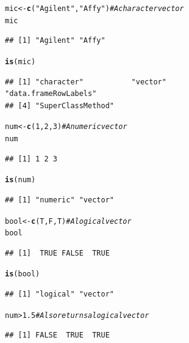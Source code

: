 \documentclass[10pt]{article}\usepackage[]{graphicx}\usepackage[]{color}
\makeatletter
\newcommand{\hlnum}[1]{\textcolor[rgb]{0.686,0.059,0.569}{#1}}%
\newcommand{\hlstr}[1]{\textcolor[rgb]{0.192,0.494,0.8}{#1}}%
\newcommand{\hlcom}[1]{\textcolor[rgb]{0.678,0.584,0.686}{\textit{#1}}}%
\newcommand{\hlopt}[1]{\textcolor[rgb]{0,0,0}{#1}}%
\newcommand{\hlstd}[1]{\textcolor[rgb]{0.345,0.345,0.345}{#1}}%
\newcommand{\hlkwb}[1]{\textcolor[rgb]{0.69,0.353,0.396}{#1}}%
\newcommand{\hlkwd}[1]{\textcolor[rgb]{0.737,0.353,0.396}{\textbf{#1}}}%
\newenvironment{kframe}{%
 \def\at@end@of@kframe{}%
 \ifinner\ifhmode%
  \def\at@end@of@kframe{\end{minipage}}%
  \begin{minipage}{\columnwidth}%
 \fi\fi%
 \def\FrameCommand##1{\hskip\@totalleftmargin \hskip-\fboxsep
 \colorbox{shadecolor}{##1}\hskip-\fboxsep
     \hskip-\linewidth \hskip-\@totalleftmargin \hskip\columnwidth}%
 \MakeFramed {\advance\hsize-\width
   \@totalleftmargin\z@ \linewidth\hsize
   \@setminipage}}%
 {\par\unskip\endMakeFramed%
 \at@end@of@kframe}
\newenvironment{knitrout}{}{} %
\makeatother
\begin{document}
\begin{knitrout}
\color{fgcolor}\begin{kframe}
\begin{alltt}
\hlstd{mic} \hlkwb{<-} \hlkwd{c}\hlstd{(}\hlstr{"Agilent"}\hlstd{,} \hlstr{"Affy"}\hlstd{)}       \hlcom{# A character vector}
\hlstd{mic}
\end{alltt}
\begin{verbatim}
## [1] "Agilent" "Affy"
\end{verbatim}
\begin{alltt}
\hlkwd{is}\hlstd{(mic)}
\end{alltt}
\begin{verbatim}
## [1] "character"           "vector"              "data.frameRowLabels"
## [4] "SuperClassMethod"
\end{verbatim}
\begin{alltt}
\hlstd{num} \hlkwb{<-} \hlkwd{c}\hlstd{(}\hlnum{1}\hlstd{,}\hlnum{2}\hlstd{,}\hlnum{3}\hlstd{)}                   \hlcom{# A numeric vector}
\hlstd{num}
\end{alltt}
\begin{verbatim}
## [1] 1 2 3
\end{verbatim}
\begin{alltt}
\hlkwd{is}\hlstd{(num)}
\end{alltt}
\begin{verbatim}
## [1] "numeric" "vector"
\end{verbatim}
\begin{alltt}
\hlstd{bool} \hlkwb{<-} \hlkwd{c}\hlstd{(T,F,T)}                  \hlcom{# A logical vector}
\hlstd{bool}
\end{alltt}
\begin{verbatim}
## [1]  TRUE FALSE  TRUE
\end{verbatim}
\begin{alltt}
\hlkwd{is}\hlstd{(bool)}
\end{alltt}
\begin{verbatim}
## [1] "logical" "vector"
\end{verbatim}
\begin{alltt}
\hlstd{num} \hlopt{>} \hlnum{1.5}                          \hlcom{# Also returns a logical vector}
\end{alltt}
\begin{verbatim}
## [1] FALSE  TRUE  TRUE
\end{verbatim}
\end{kframe}
\end{knitrout}
\medskip
\end{document}
